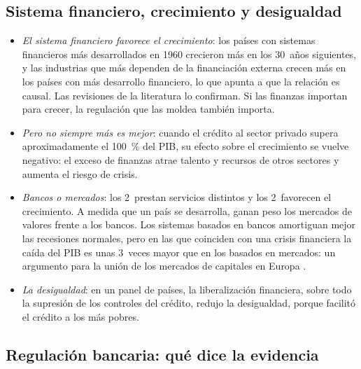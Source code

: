 \documentclass[11pt]{article}
\begin{document}
\subsection{Sistema financiero, crecimiento y desigualdad}\label{sec:crecimiento}

\begin{itemize}
\item \emph{El sistema financiero favorece el crecimiento}: los países con sistemas financieros más desarrollados en 1960 crecieron más en los 30~años siguientes\nocite{KingLevine1993}, y las industrias que más dependen de la financiación externa crecen más en los países con más desarrollo financiero, lo que apunta a que la relación es causal\nocite{RajanZingales1998}. Las revisiones de la literatura lo confirman\nocite{Levine2005,Beck2012}. Si las finanzas importan para crecer, la regulación que las moldea también importa.
\item \emph{Pero no siempre más es mejor}: cuando el crédito al sector privado supera aproximadamente el 100~\% del PIB, su efecto sobre el crecimiento se vuelve negativo\nocite{ArcandBerkesPanizza2015,CecchettiKharroubi2012}: el exceso de finanzas atrae talento y recursos de otros sectores y aumenta el riesgo de crisis.
\item \emph{Bancos o mercados}: los 2~prestan servicios distintos y los 2~favorecen el crecimiento\nocite{LevineZervos1998}. A medida que un país se desarrolla, ganan peso los mercados de valores frente a los bancos\nocite{DemirgucKuntFeyenLevine2013}. Los sistemas basados en bancos amortiguan mejor las recesiones normales, pero en las que coinciden con una crisis financiera la caída del PIB es unas 3~veces mayor que en los basados en mercados\nocite{GambacortaYangTsatsaronis2014}: un argumento para la unión de los mercados de capitales en Europa .
\item \emph{La desigualdad}: en un panel de países, la liberalización financiera, sobre todo la supresión de los controles del crédito, redujo la desigualdad, porque facilitó el crédito a los más pobres\nocite{DelisHasanKazakis2014}.
\end{itemize}

\subsection{Regulación bancaria: qué dice la evidencia}\label{sec:evidencia-regulacion}
\end{document}
